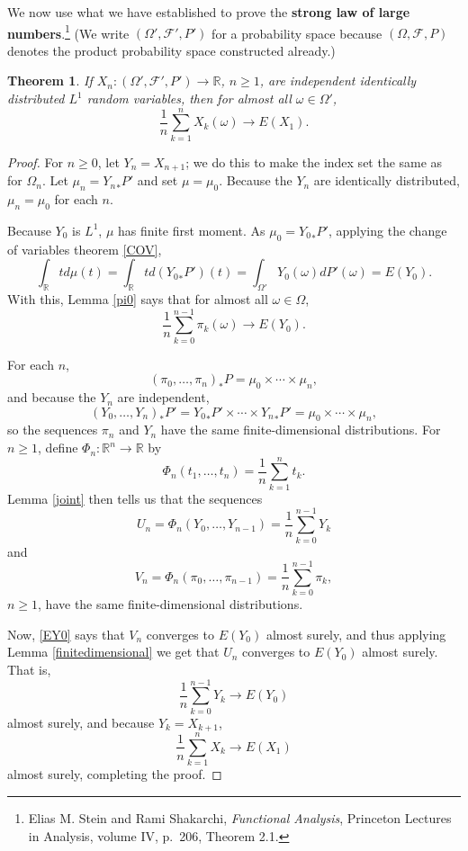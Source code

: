 \documentclass{article}
\newtheorem{theorem}{Theorem}
\theoremstyle{definition}
\begin{document}
We now use what we have established to prove the \textbf{strong law of large numbers}.\footnote{Elias M. Stein and Rami Shakarchi,
{\em Functional Analysis}, Princeton Lectures in Analysis, volume IV, p.~206, Theorem 2.1.}
(We write $(\Omega',\mathscr{F}',P')$ for a probability space because  $(\Omega,\mathscr{F},P)$
denotes the product probability space constructed already.)

\begin{theorem}
If $X_n:(\Omega',\mathscr{F}',P') \to \mathbb{R}$, $n \geq 1$, are independent identically distributed $L^1$ random variables, then
for almost all $\omega \in \Omega'$,
\[
\frac{1}{n} \sum_{k=1}^n X_k(\omega) \to E(X_1).
\]
\end{theorem}
\begin{proof}
For $n \geq 0$, let $Y_n = X_{n+1}$; we do this to 
make the index set the same as for $\Omega_n$. 
Let $\mu_n={Y_n}_*P'$ and set $\mu=\mu_0$. Because the $Y_n$ are  identically distributed,
$\mu_n=\mu_0$ for each $n$.

Because $Y_0$ is $L^1$, $\mu$ has finite first moment. 
As
$\mu_0={Y_0}_*P'$, applying
the change of variables theorem \eqref{COV},
\[
\int_{\mathbb{R}} t d\mu(t) = \int_{\mathbb{R}} t d({Y_0}_*P')(t)
=\int_{\Omega'} Y_0(\omega) dP'(\omega) = E(Y_0).
\]
With this, Lemma \ref{pi0} says that for almost all $\omega \in \Omega$,
\begin{equation}
\frac{1}{n} \sum_{k=0}^{n-1} \pi_k(\omega) \to E(Y_0).
\label{EY0}
\end{equation}


For each $n$, 
\[
(\pi_0,\ldots,\pi_n)_*P = \mu_0 \times \cdots \times \mu_n,
\]
and because the $Y_n$ are independent,
\[
(Y_0,\ldots,Y_n)_* P' = {Y_0}_*P' \times \cdots \times {Y_n}_*P' = 
\mu_0 \times \cdots \times \mu_n,
\]
so the sequences $\pi_n$ and $Y_n$ have the same finite-dimensional distributions. 
For $n \geq 1$, define $\Phi_n:\mathbb{R}^n \to \mathbb{R}$ by
\[
\Phi_n(t_1,\ldots,t_n) = \frac{1}{n} \sum_{k=1}^n t_k.
\]
Lemma \ref{joint} then tells us that the sequences 
\[
U_n=\Phi_{n}(Y_0,\ldots,Y_{n-1}) = \frac{1}{n} \sum_{k=0}^{n-1} Y_k
\]
 and
 \[
 V_n=\Phi_{n}(\pi_0,\ldots,\pi_{n-1}) = \frac{1}{n} \sum_{k=0}^{n-1} \pi_k,
 \] 
$n \geq 1$, have the same finite-dimensional distributions. 

Now, \eqref{EY0} says that $V_n$ converges to $E(Y_0)$ almost surely, and thus applying
Lemma \ref{finitedimensional} we get that $U_n$ converges to $E(Y_0)$ almost surely.
That is, 
\[
\frac{1}{n} \sum_{k=0}^{n-1} Y_k \to E(Y_0)
\]
almost surely,
and because $Y_k=X_{k+1}$,
\[
\frac{1}{n} \sum_{k=1}^n X_k \to E(X_1)
\]
almost surely,
completing the proof.
\end{proof}
\end{document}
